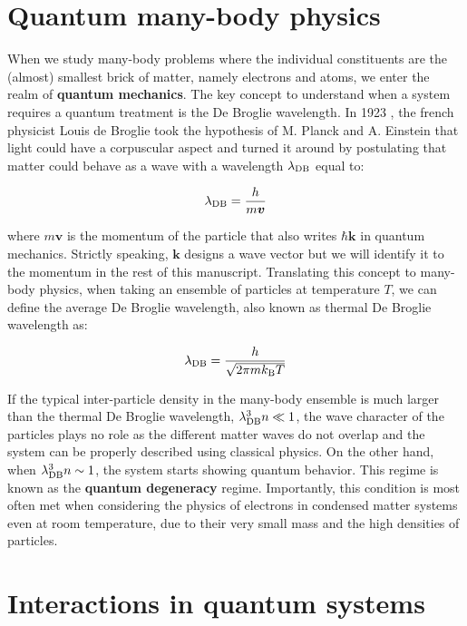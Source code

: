\section*{Quantum many-body physics}

When we study many-body problems where the individual constituents are the (almost) smallest brick of matter, namely electrons and atoms, we enter the realm of \textbf{quantum mechanics}. The key concept to understand when a system requires a quantum treatment is the De Broglie wavelength. In 1923 \cite{debroglie:tel-00006807}, the french physicist Louis de Broglie took the hypothesis of M. Planck and A. Einstein that light could have a corpuscular aspect and turned it around by postulating that matter could behave as a wave with a wavelength $\lambda_{\rm{DB}}$ equal to:

\begin{equation}
    \lambda_{\rm{DB}} = \frac{h}{m\bm{v}}
\end{equation}

\noindent where $m\bm{v}$ is the momentum of the particle that also writes $\hbar \bm{k}$ in quantum mechanics. Strictly speaking, $\bm{k}$ designs a wave vector but we will identify it to the momentum in the rest of this manuscript. Translating this concept to many-body physics, when taking an ensemble of particles at temperature $T$, we can define the average De Broglie wavelength, also known as thermal De Broglie wavelength as:

\begin{equation}
    \lambda_{\rm{DB}} = \frac{h}{\sqrt{2 \pi m k_{\mathrm{B}} T}}
\end{equation}

\noindent If the typical inter-particle density in the many-body ensemble is much larger than the thermal De Broglie wavelength, \ie $\lambda_{\rm{DB}}^3 n \ll 1$, the wave character of the particles plays no role as the different matter waves do not overlap and the system can be properly described using classical physics. On the other hand, when $\lambda_{\rm{DB}}^3 n \sim 1$, the system starts showing quantum behavior. This regime is known as the \textbf{quantum degeneracy} regime. Importantly, this condition is most often met when considering the physics of electrons in condensed matter systems even at room temperature, due to their very small mass and the high densities of particles.

\section*{Interactions in quantum systems}

